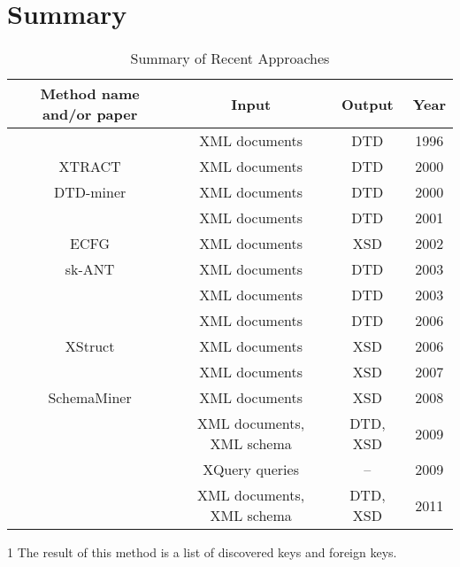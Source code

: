 \section{Summary}
\begin{table}
  \begin{threeparttable}
  \footnotesize \begin{tabular}{|c|c|c|c|}
    \hline
    \textbf{Method name and/or paper} & \textbf{Input} & \textbf{Output} & \textbf{Year} \\ \hline \hline
    \cite{ahonen} & XML documents & DTD & 1996 \\ \hline
    XTRACT \cite{Garofalakis:2000:XSE:342009.335409} & XML documents & DTD & 2000 \\ \hline
    DTD-miner \cite{Moh:2000:RSW:336597.336638} & XML documents & DTD & 2000 \\ \hline
    \cite{Fernau:2001:LXG:645744.667236} & XML documents & DTD & 2001 \\ \hline
    ECFG \cite{Chidlovskii:2002:SEX:544220.544288} & XML documents & XSD & 2002 \\ \hline
    sk-ANT \cite{Wong03onstructural} & XML documents & DTD & 2003 \\ \hline
    \cite {Min:2003:EES:639473.639475} & XML documents & DTD & 2003 \\ \hline
    \cite{Bex:2006:ICD:1182635.1164139} & XML documents & DTD & 2006 \\ \hline
    XStruct \cite {Hegewald:2006:XES:1129755.1130124} & XML documents & XSD & 2006 \\ \hline
    \cite{Bex:2007:IXS:1325851.1325964} & XML documents & XSD & 2007 \\ \hline
    SchemaMiner \cite{Vosta:2008:EAC:1802514.1802522} & XML documents & XSD & 2008 \\ \hline
    \cite{Mlynkova:2009:IXS:1862681.1862693} & XML documents, XML schema & DTD, XSD & 2009 \\ \hline
    \cite{Necasky:2009:DXK:1529282.1529414} & XQuery queries & --\tnote{1} & 2009 \\ \hline
    \cite{thesis_klempa} & XML documents, XML schema & DTD, XSD & 2011 \\ \hline
  \end{tabular}
  \begin{tablenotes}
	\item [1] The result of this method is a list of discovered keys and foreign keys.
  \end{tablenotes}
  \caption{Summary of Recent Approaches}
  \label{table_summary_of_recent_approaches}
  \end{threeparttable}
\end{table}

